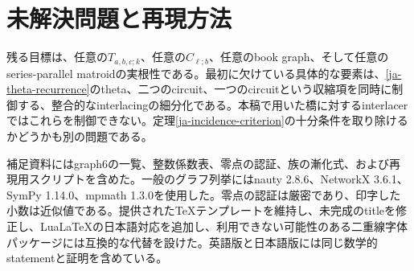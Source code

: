 \documentclass[12pt]{amsart}
\theoremstyle{definition}
\theoremstyle{remark}
\numberwithin{equation}{section}
\begin{document}
\section{未解決問題と再現方法}
残る目標は、任意の$T_{a,b,c;k}$、任意の$C_{\boldsymbol\ell;b}$、任意のbook graph、そして任意のseries-parallel matroidの実根性である。最初に欠けている具体的な要素は、\eqref{ja-theta-recurrence}のtheta、二つのcircuit、一つのcircuitという収縮項を同時に制御する、整合的なinterlacingの細分化である。本稿で用いた橋に対するinterlacerではこれらを制御できない。定理\ref{ja-incidence-criterion}の十分条件を取り除けるかどうかも別の問題である。

補足資料にはgraph6の一覧、整数係数表、零点の認証、族の漸化式、および再現用スクリプトを含めた。一般のグラフ列挙にはnauty 2.8.6、NetworkX 3.6.1、SymPy 1.14.0、mpmath 1.3.0を使用した。零点の認証は厳密であり、印字した小数は近似値である。提供されたTeXテンプレートを維持し、未完成のtitleを修正し、LuaLaTeXの日本語対応を追加し、利用できない可能性のある二重線字体パッケージには互換的な代替を設けた。英語版と日本語版には同じ数学的statementと証明を含めている。
\end{document}
